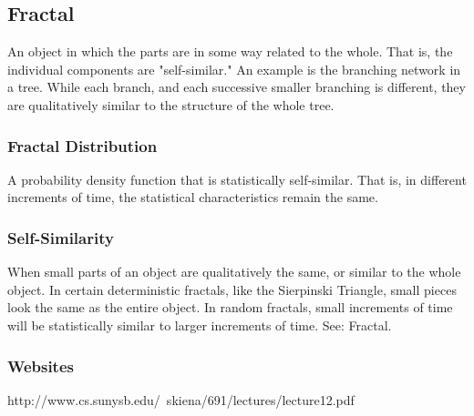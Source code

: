 \subsection*{Fractal}
An object in which the parts are in some way related to the whole. That is, the individual components are "self-similar." An example is the branching network in a tree. While each branch, and each successive smaller branching is different, they are qualitatively similar to the structure of the whole tree.

\subsubsection*{Fractal Distribution}
A probability density function that is statistically self-similar. That is, in different increments of time, the statistical characteristics remain the same.

\subsubsection*{Self-Similarity}
When small parts of an object are qualitatively the same, or similar to the whole object. In certain deterministic fractals, like the Sierpinski Triangle, small pieces look the same as the entire object. In random fractals, small increments of time will be statistically similar to larger increments of time. See: Fractal.

\subsubsection*{ Websites}
http://www.cs.sunysb.edu/~skiena/691/lectures/lecture12.pdf
